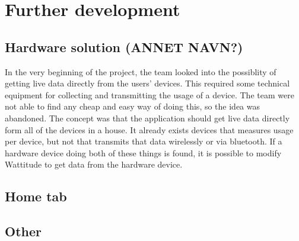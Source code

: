 \chapter{Further development}

\section{Hardware solution (ANNET NAVN?)}
In the very beginning of the project, the team looked into the possiblity of getting live data directly from the users' devices. This required some technical equipment for collecting and transmitting the usage of a device. The team were not able to find any cheap and easy way of doing this, so the idea was abandoned. The concept was that the application should get live data directly form all of the devices in a house. It already exists devices that measures usage per device, but not that transmits that data wirelessly or via bluetooth. If a hardware device doing both of these things is found, it is possible to modify Wattitude to get data from the hardware device. 

\section{Home tab}

\section{Other}